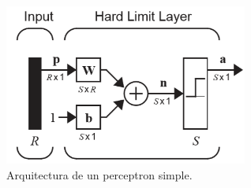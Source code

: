 \documentclass[12pt, titlepage]{article}
\begin{document}
\begin{figure}[H]
    \begin{center}
        \includegraphics[width=8cm]{img/perceptron/perceptron.png}
        \caption{Arquitectura de un perceptron simple. \cite{libro1}}
        \label{fig:perpectron-diagrama2}
    \end{center}
\end{figure}
\end{document}
